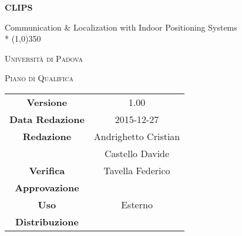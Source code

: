 \documentclass{article}
\author{Andrighetto Cristian, Castello Davide}
\date{27/12/2015}
\begin{document}
	\begin{titlepage}
		\centering
	{\huge\bfseries CLIPS\par}
	Communication \& Localization with Indoor Positioning Systems \\*
	\line(1,0){350} \\
	{\scshape\LARGE Università di Padova \par}
	\vspace{1cm}
	{\scshape\Large Piano di Qualifica \par}
	\logo
	\newpage
		\begin{tabular}{c|c}
			{\hfill \textbf{Versione}} 			& 1.00			\\
			{\hfill\textbf{Data Redazione}} 		& 2015-12-27  		\\ 
			{\hfill\textbf{Redazione}} 			&  Andrighetto Cristian \\ 
											& Castello Davide       \\
			{\hfill\textbf{Verifica}} 				&  Tavella Federico   \\
			{\hfill\textbf{Approvazione}} 		&  \\
			{\hfill\textbf{Uso}} 					& Esterno			\\
			{\hfill\textbf{Distribuzione}} 			& \leaf			\\
		\end{tabular}
	\end{titlepage}
	
	\newpage
	\pagestyle{myfront}
		
	
	\newpage
		\tableofcontents
	
	\newpage
		\listoftables
	
	\label{LastFrontPage}
	\newpage
		\pagestyle{mymain}
	
\newpage
	
\newpage
	
\newpage
	
\newpage
	
\newpage
	
\label{LastPage}
\end{document}
